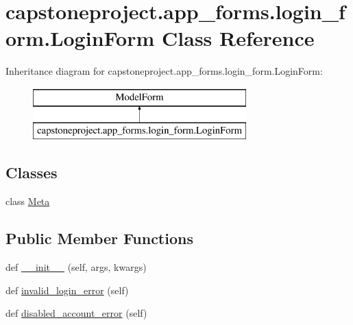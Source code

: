 \hypertarget{classcapstoneproject_1_1app__forms_1_1login__form_1_1_login_form}{}\section{capstoneproject.\+app\+\_\+forms.\+login\+\_\+form.\+Login\+Form Class Reference}
\label{classcapstoneproject_1_1app__forms_1_1login__form_1_1_login_form}
Inheritance diagram for capstoneproject.\+app\+\_\+forms.\+login\+\_\+form.\+Login\+Form\+:\begin{figure}[H]
\begin{center}
\leavevmode
\includegraphics[height=2.000000cm]{classcapstoneproject_1_1app__forms_1_1login__form_1_1_login_form}
\end{center}
\end{figure}
\subsection*{Classes}
\begin{DoxyCompactItemize}
\item 
class \mbox{\hyperlink{classcapstoneproject_1_1app__forms_1_1login__form_1_1_login_form_1_1_meta}{Meta}}
\end{DoxyCompactItemize}
\subsection*{Public Member Functions}
\begin{DoxyCompactItemize}
\item 
def \mbox{\hyperlink{classcapstoneproject_1_1app__forms_1_1login__form_1_1_login_form_a1518cef9040021afd7b25e75431faa85}{\+\_\+\+\_\+init\+\_\+\+\_\+}} (self, args, kwargs)
\item 
def \mbox{\hyperlink{classcapstoneproject_1_1app__forms_1_1login__form_1_1_login_form_a89b9a65feba7421fd610692da108784b}{invalid\+\_\+login\+\_\+error}} (self)
\item 
def \mbox{\hyperlink{classcapstoneproject_1_1app__forms_1_1login__form_1_1_login_form_a0494783f51f38272bc81a6d6bb50829b}{disabled\+\_\+account\+\_\+error}} (self)
\end{DoxyCompactItemize}
